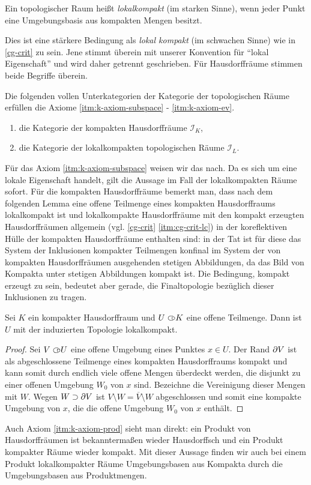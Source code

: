 \begin{defn} \label{def:loc-compact}
  Ein topologischer Raum heißt \emph{lokalkompakt} (im starken Sinne),
  wenn jeder Punkt eine Umgebungsbasis aus kompakten Mengen besitzt.
\end{defn}
\begin{bem} \label{loc-compact-usage}
  Dies ist eine stärkere Bedingung als \emph{lokal kompakt} (im
  schwachen Sinne) wie in \ref{cg-crit} zu sein. Jene stimmt überein
  mit unserer Konvention für ``lokal Eigenschaft'' und wird daher
  getrennt geschrieben. Für Hausdorffräume stimmen beide Begriffe
  überein.
\end{bem}
\begin{prop}
  Die folgenden vollen Unterkategorien der Kategorie der topologischen
  Räume erfüllen die Axiome \ref{itm:k-axiom-subspace} -
  \ref{itm:k-axiom-ev}.
  \begin{enumerate}[label=(\roman*)]
  \item die Kategorie der kompakten Hausdorffräume $\mathcal{I}_K$,
  \item die Kategorie der lokalkompakten topologischen Räume
    $\mathcal{I}_L$.
  \end{enumerate}
\end{prop}
Für das Axiom \ref{itm:k-axiom-subspace} weisen wir das nach. Da es
sich um eine lokale Eigenschaft handelt, gilt die Aussage im Fall der
lokalkompakten Räume sofort. Für die kompakten Hausdorffräume bemerkt
man, dass nach dem folgenden Lemma eine offene Teilmenge eines
kompakten Hausdorffraums lokalkompakt ist und lokalkompakte
Hausdorffräume mit den kompakt erzeugten Hausdorffräumen allgemein
(vgl. \ref{cg-crit} \ref{itm:cg-crit-lc}) in der koreflektiven Hülle
der kompakten Hausdorffräume enthalten sind: in der Tat ist für diese
das System der Inklusionen kompakter Teilmengen konfinal im System der
von kompakten Hausdorffräumen ausgehenden stetigen Abbildungen, da das
Bild von Kompakta unter stetigen Abbildungen kompakt ist. Die
Bedingung, kompakt erzeugt zu sein, bedeutet aber gerade, die
Finaltopologie bezüglich dieser Inklusionen zu tragen.
\begin{lemma}
  Sei $K$ ein kompakter Hausdorffraum und $U \subset\kern-0.58em\circ K$ eine offene
  Teilmenge. Dann ist $U$ mit der induzierten Topologie lokalkompakt.
\end{lemma}
\begin{proof}
  Sei $V \subset\kern-0.58em\circ U$ eine offene Umgebung eines Punktes $x \in U$. Der
  Rand $\partial V$ ist als abgeschlossene Teilmenge eines kompakten
  Hausdorffraums kompakt und kann somit durch endlich viele offene
  Mengen überdeckt werden, die disjunkt zu einer offenen Umgebung
  $W_0$ von $x$ sind. Bezeichne die Vereinigung dieser Mengen mit
  $W$. Wegen $W \supset \partial V$ ist $V \setminus W = \overline{V}
  \setminus W$ abgeschlossen und somit eine kompakte Umgebung von $x$,
  die die offene Umgebung $W_0$ von $x$ enthält.
\end{proof}
Auch Axiom \ref{itm:k-axiom-prod} sieht man direkt: ein Produkt von
Hausdorffräumen ist bekanntermaßen wieder Hausdorffsch und ein Produkt
kompakter Räume wieder kompakt. Mit dieser Aussage finden wir auch bei
einem Produkt lokalkompakter Räume Umgebungsbasen aus Kompakta durch
die Umgebungsbasen aus Produktmengen.

